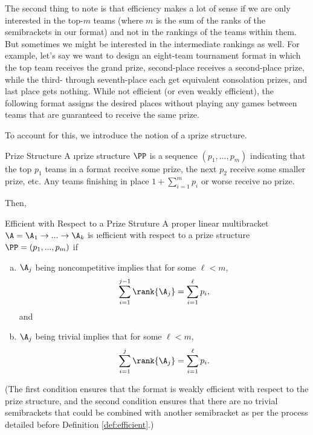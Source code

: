 {    The second thing to note is that efficiency makes a lot of sense if we are only interested in the top-$m$ teams (where $m$ is the sum of the ranks of the semibrackets in our format) and not in the rankings of the teams within them. But sometimes we might be interested in the intermediate rankings as well. For example, let's say we want to design an eight-team tournament format in which the top team receives the grand prize, second-place receives a second-place prize, while the third- through seventh-place each get equivalent consolation prizes, and last place gets nothing. While not efficient (or even weakly efficient), the following format assigns the desired places without playing any games between teams that are guaranteed to receive the same prize.


    To account for this, we introduce the notion of a \i{prize structure}.
    
    \begin{definition}{Prize Structure}{}
        A \i{prize structure} $\PP$ is a sequence $(p_1, ..., p_m)$ indicating that the top $p_1$ teams in a format receive some prize, the next $p_2$ receive some smaller prize, etc. Any teams finishing in place $1 + \sum_{i=1}^m p_i$ or worse receive no prize.
    \end{definition}

    Then,

    \begin{definition}{Efficient with Respect to a Prize Struture}{}
        A proper linear multibracket $\A = \A_1 \to ... \to \A_k$ is \i{efficient with respect to a prize structure} $\PP = (p_1, ..., p_m)$ if
        \begin{enumerate}[(a)]
            \item $\A_j$ being noncompetitive implies that for some $\ell < m$, $$\sum_{i=1}^{j-1} \rank {\A_j} = \sum_{i=1}^\ell p_i,$$
                         and
            \item $\A_j$ being trivial implies that for some $\ell < m$, $$\sum_{i=1}^{j} \rank {\A_j} = \sum_{i=1}^\ell p_i.$$
        \end{enumerate}
    \end{definition}

    (The first condition ensures that the format is weakly efficient with respect to the prize structure, and the second condition ensures that there are no trivial semibrackets that could be combined with another semibracket as per the process detailed before Definition \ref{def:efficient}.)

}
